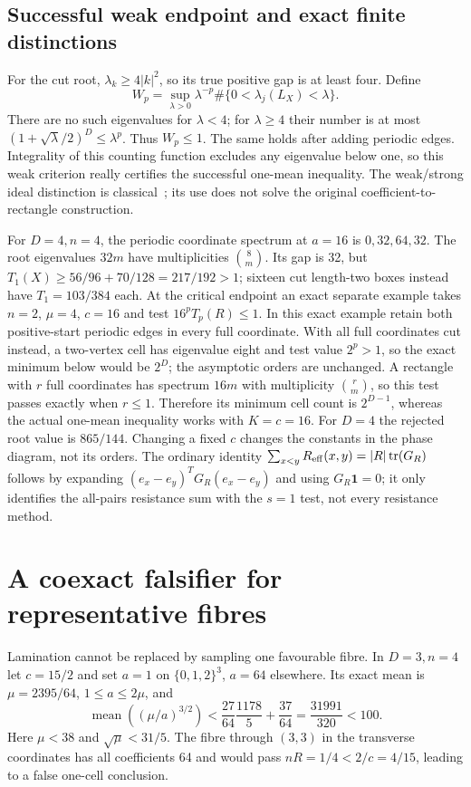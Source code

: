 \subsection{Successful weak endpoint and exact finite distinctions}
For the cut root, $\lambda_k\ge4|k|^2$, so its true positive gap is at
least four. Define
\[
 W_p=\sup_{\lambda>0}\lambda^{-p}
          \#\{0<\lambda_j(L_X)<\lambda\}.
\]
There are no such eigenvalues for $\lambda<4$; for $\lambda\ge4$ their
number is at most $(1+\sqrt\lambda/2)^D\le\lambda^p$. Thus $W_p\le1$.
The same holds after adding periodic edges. Integrality of this counting
function excludes any eigenvalue below one, so this weak criterion really
certifies the successful one-mean inequality. The weak/strong ideal
distinction is classical~\cite{lg:frank}; its use does not solve the original
coefficient-to-rectangle construction.

For $D=4,n=4$, the periodic coordinate spectrum at $a=16$ is
$0,32,64,32$. The root eigenvalues $32m$ have multiplicities
$\binom8m$. Its gap is 32, but
$T_1(X)\ge56/96+70/128=217/192>1$; sixteen cut length-two boxes instead
have $T_1=103/384$ each. At the critical endpoint an exact separate
example takes $n=2$, $\mu=4$, $c=16$ and test $16^pT_p(R)\le1$.
In this exact example retain both positive-start periodic edges in every
full coordinate. With all full coordinates cut instead, a two-vertex cell
has eigenvalue eight and test value $2^p>1$, so the exact minimum below
would be $2^D$; the asymptotic orders are unchanged.
A rectangle with $r$ full coordinates has spectrum $16m$ with multiplicity
$\binom rm$, so this test passes exactly when $r\le1$. Therefore its
minimum cell count is $2^{D-1}$, whereas the actual one-mean inequality
works with $K=c=16$. For $D=4$ the rejected root value is $865/144$.
Changing a fixed $c$ changes the constants in the phase diagram, not its
orders. The ordinary identity
$\sum_{x<y}R_{\rm eff}(x,y)=|R|\operatorname{tr}(G_R)$ follows by expanding
$(e_x-e_y)^TG_R(e_x-e_y)$ and using $G_R\mathbf1=0$; it only identifies
the all-pairs resistance sum with the $s=1$ test, not every resistance method.

\section{A coexact falsifier for representative fibres}
Lamination cannot be replaced by sampling one favourable fibre. In
$D=3,n=4$ let $c=15/2$ and set $a=1$ on $\{0,1,2\}^3$, $a=64$
elsewhere. Its exact mean is $\mu=2395/64$, $1\le a\le2\mu$, and
\[
 \operatorname{mean}((\mu/a)^{3/2})
 <\frac{27}{64}\frac{1178}{5}+\frac{37}{64}
 =\frac{31991}{320}<100.
\]
Here $\mu<38$ and $\sqrt\mu<31/5$. The fibre through $(3,3)$ in the
transverse coordinates has all coefficients 64 and would pass
$nR=1/4<2/c=4/15$, leading to a false one-cell conclusion.

